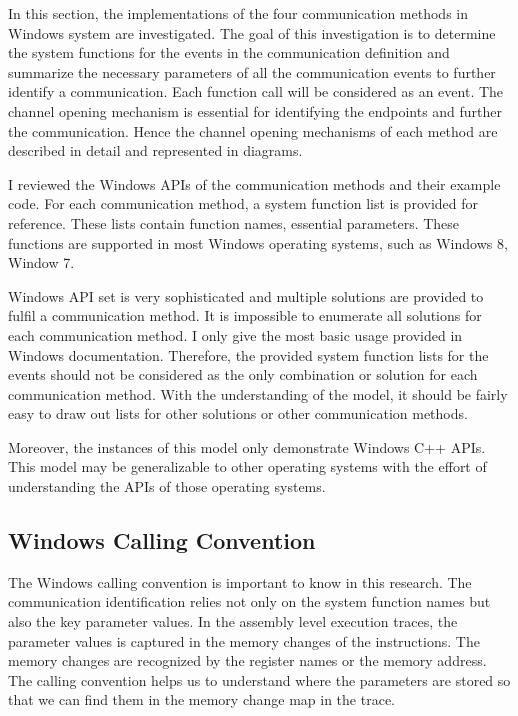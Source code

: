 In this section, the implementations of the four communication methods in Windows system are investigated. The goal of this investigation is to determine the system functions for the events in the communication definition and summarize the necessary parameters of all the communication events to further identify a communication. Each function call will be considered as an event. The channel opening mechanism is essential for identifying the endpoints and further the communication. Hence the channel opening mechanisms of each method are described in detail and represented in diagrams. 

I reviewed the Windows APIs of the communication methods and their example code. For each communication method, a system function list is provided for reference. These lists contain function names, essential parameters. These functions are supported in most Windows operating systems, such as Windows 8, Window 7. 

Windows API set is very sophisticated and multiple solutions are provided to fulfil a communication method. It is impossible to enumerate all solutions for each communication method. I only give the most basic usage provided in Windows documentation. Therefore, the provided system function lists for the events should not be considered as the only combination or solution for each communication method. With the understanding of the model, it should be fairly easy to draw out lists for other solutions or other communication methods. 

Moreover, the instances of this model only demonstrate Windows C++ APIs. This model may be generalizable to other operating systems with the effort of understanding the APIs of those operating systems.

\subsection{Windows Calling Convention}
The Windows calling convention is important to know in this research. The communication identification relies not only on the system function names but also the key parameter values. In the assembly level execution traces, the parameter values is captured in the memory changes of the instructions. The memory changes are recognized by the register names or the memory address. The calling convention helps us to understand where the parameters are stored so that we can find them in the memory change map in the trace.


